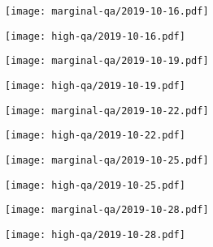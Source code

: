 \documentclass{article}
\begin{document}
\begin{figure}[H]
	\ContinuedFloat
	\centering
	\begin{subfigure}{0.48\linewidth}
		\texttt{[image: marginal-qa/2019-10-16.pdf]}
	\end{subfigure}
	\begin{subfigure}{0.48\linewidth}
		\texttt{[image: high-qa/2019-10-16.pdf]}
	\end{subfigure}
	\begin{subfigure}{0.48\linewidth}
		\texttt{[image: marginal-qa/2019-10-19.pdf]}
	\end{subfigure}
	\begin{subfigure}{0.48\linewidth}
		\texttt{[image: high-qa/2019-10-19.pdf]}
	\end{subfigure}
	\begin{subfigure}{0.48\linewidth}
		\texttt{[image: marginal-qa/2019-10-22.pdf]}
	\end{subfigure}
	\begin{subfigure}{0.48\linewidth}
		\texttt{[image: high-qa/2019-10-22.pdf]}
	\end{subfigure}
	\begin{subfigure}{0.48\linewidth}
		\texttt{[image: marginal-qa/2019-10-25.pdf]}
	\end{subfigure}
	\begin{subfigure}{0.48\linewidth}
		\texttt{[image: high-qa/2019-10-25.pdf]}
	\end{subfigure}
	\begin{subfigure}{0.48\linewidth}
		\texttt{[image: marginal-qa/2019-10-28.pdf]}
	\end{subfigure}
	\begin{subfigure}{0.48\linewidth}
		\texttt{[image: high-qa/2019-10-28.pdf]}
	\end{subfigure}
\end{figure}
\end{document}
